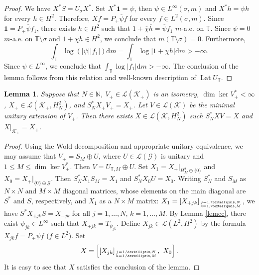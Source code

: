 \documentclass[a4paper,oneside,11pt]{amsart}
\numberwithin{equation}{section}
\theoremstyle{plain}
\newtheorem{lemma}[theorem]{Lemma}
\theoremstyle{definition}
\begin{document}
\begin{proof}  We have $X^*S=U_\sigma X^*$. Set $X^*\mathbf{1}=\psi$, 
then $\psi \in L^\infty (\sigma,m)$ and $X^*h=\psi h$ for every $h\in H^2$. Therefore, 
$Xf=P_+\overline\psi f$ for every $f\in L^2(\sigma,m)$. Since $\mathbf{1}=P_+\overline\psi f_1$,   
there exists $h\in H^2$ such that $1+\overline\chi \overline h=\overline\psi f_1$ $m$-a.e. on $\mathbb T$. 
Since $\psi=0$ $m$-a.e. on $\mathbb T\setminus\sigma$ and $1+\chi h\in H^2$, we conclude that 
$m(\mathbb T\setminus\sigma)=0$. Furthermore, 
\begin{equation*} \int_{\mathbb T}\log(|\psi||f_1|)\mathrm{d}m=
\int_{\mathbb T}\log|1+\chi h|\mathrm{d}m>-\infty.
\end{equation*}
Since $\psi \in L^\infty$, we conclude that $\int_{\mathbb T}\log|f_1|\mathrm{d}m>-\infty$. 
The conclusion of the lemma follows from this relation and well-known description of $\operatorname{Lat}U_{\mathbb T}$. 
\end{proof}

\begin{lemma} \label{lem12} Suppose that $N\in\mathbb N$,
  $V_+\in\mathcal L(\mathcal K_+)$ is an isometry, $\dim\ker V_+^*<\infty$, 
 $X_+\in\mathcal L(\mathcal K_+, H_N^2)$, and $S_N^*X_+V_+=X_+$.
 Let $V\in\mathcal L(\mathcal K)$ be the minimal unitary extension of $V_+$.
Then there exists $X\in\mathcal L(\mathcal K, H_N^2)$ such  $S_N^*XV=X$ and 
$X|_{\mathcal K_+}=X_+$.
\end{lemma}

\begin{proof}
Using the Wold decomposition and appropriate unitary equivalence, we may assume that  $V_+= S_M\oplus U$, 
where $U\in\mathcal L(\mathcal G)$ is unitary and $1\leq M\leq\dim\ker V_+^*$. Then $V=U_{\mathbb T,M}\oplus U$. 
Set $X_1=X_+|_{H_M^2\oplus\{0\}}$ and $X_0=X_+|_{\{0\}\oplus\mathcal G}$. Then $S_N^*X_1S_M=X_1$ and $S_N^*X_0U=X_0$. 
Writing $S_N^*$ and  $S_M$ as $N\times N$ and $M\times M$ diagonal   matrices, whose elements on the main diagonal are 
$S^*$ and $S$, respectively, and $X_1$ as a $N\times M$ matrix: $X_1=[X_{+jk}]_{j=1,\ldots, N\atop k=1,\ldots,M}$, 
we have $S^*X_{+jk}S=X_{+jk}$ for all $j=1,\ldots, N$, $k=1,\ldots,M$. By Lemma \ref{lemcc}, there exist 
$\psi_{jk}\in L^\infty$ such that $X_{+jk}=T_{\psi_{jk}}$.  Define $X_{jk}\in\mathcal L(L^2, H^2)$
by the formula $X_{jk}f=P_+\psi f$ ($f\in L^2$). 
Set \begin{equation*} X=\left[[X_{jk}]_{j=1,\ldots, N \atop k=1,\ldots,M},\ X_0\right].
\end{equation*}
It is easy to see that $X$ satisfies the conclusion of the lemma. 
\end{proof}
\end{document}
